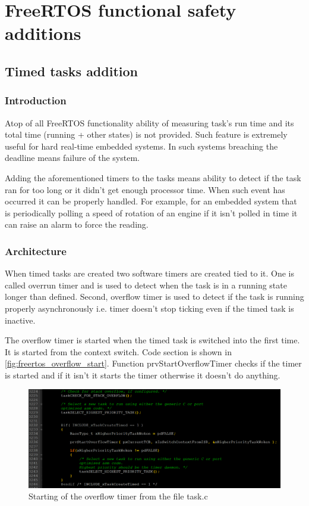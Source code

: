 \chapter{FreeRTOS functional safety additions}
\label{freertos_modification}

\section{Timed tasks addition}

\subsection{Introduction}

Atop of all FreeRTOS functionality ability of measuring task's run time and its total time (running + other states) is not provided. Such feature is extremely useful for hard real-time embedded systems. In such systems breaching the deadline means failure of the system.

Adding the aforementioned timers to the tasks means ability to detect if the task ran for too long or it didn't get enough processor time. When such event has occurred it can be properly handled. For example, for an embedded system that is periodically polling a speed of rotation of an engine if it isn't polled in time it can raise an alarm to force the reading.

\subsection{Architecture}


When timed tasks are created two software timers are created tied to it. One is called overrun timer and is used to detect when the task is in a running state longer than defined. Second, overflow timer is used to detect if the task is running properly asynchronously i.e. timer doesn't stop ticking even if the timed task is inactive.  

The overflow timer is started when the timed task is switched into the first time. It is started from the context switch. Code section is shown in \autoref{fig:freertos_overflow_start}. Function prvStartOverflowTimer checks if the timer is started and if it isn't it starts the timer otherwise it doesn't do anything.


\begin{figure}[H]

      \centering
      \includegraphics[width=\linewidth]{images/freertos_overflow_start.png}
      \caption{Starting of the overflow timer from the file task.c}
      \label{fig:freertos_overflow_start}
    
\end{figure}


